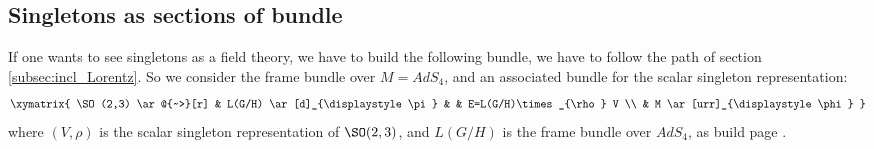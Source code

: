 					\subsection{Singletons as sections of bundle}

If one wants to see singletons as a field theory, we have to build the following bundle, we have to follow the path of section \ref{subsec:incl_Lorentz}. So we consider the frame bundle over $M=AdS_4$, and an associated bundle for the scalar singleton representation:
\begin{equation}
 \xymatrix{
	\SO(2,3)  \ar@{~>}[r]	& L(G/H) \ar[d]_{\displaystyle \pi}	&	& E=L(G/H)\times_{\rho} V \\
				& M \ar[urr]_{\displaystyle\phi}	  
  }
\end{equation}
where $(V,\rho)$ is the scalar singleton representation of $\SO(2,3)$, and $L(G/H)$ is the frame bundle over $AdS_4$, as build page \pageref{PgFrameHomo}.
